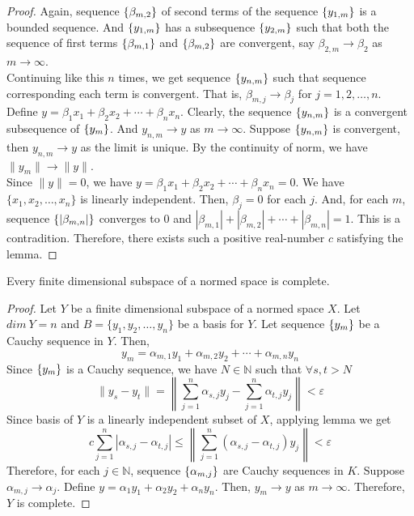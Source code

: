 \begin{proof}
	Again, sequence $\left\{\beta_{m,2}\right\}$ of second terms of the sequence $\left\{y_{1,m}\right\}$ is a bounded sequence.
	And $\left\{y_{1,m}\right\}$ has a subsequence $\left\{y_{2,m}\right\}$ such that both the sequence of first terms $\left\{\beta_{m,1}\right\}$ and $\left\{\beta_{m,2}\right\}$ are convergent, say $\beta_{2,m} \to \beta_2$ as $m \to \infty$.\\

	Continuing like this $n$ times, we get sequence $\left\{y_{n,m}\right\}$ such that sequence corresponding each term is convergent.
	That is, $\beta_{m,j} \to \beta_j$ for $j=1,2,\dots,n$.\\

	Define $y = \beta_1 x_1 + \beta_2 x_2 + \dotsb + \beta_n x_n$.
	Clearly, the sequence $\left\{y_{n,m}\right\}$ is a convergent subsequence of $\left\{y_m\right\}$.
	And $y_{n,m} \to y$ as $m \to \infty$.
	Suppose $\left\{y_{n,m}\right\}$ is convergent, then $y_{n,m} \to y$ as the limit is unique.
	By the continuity of norm, we have $\| y_m \| \to \| y \|$.\\

	Since $\| y \| = 0$, we have $y = \beta_1 x_1 + \beta_2 x_2 + \dotsb + \beta_n x_n = 0$.
	We have $\{ x_1, x_2, \dots, x_n \}$ is linearly independent.
	Then, $\beta_j = 0$ for each $j$.
	And, for each $m$, sequence $\left\{|\beta_{m,n} |\right\}$ converges to $0$ and $|\beta_{m,1}|+|\beta_{m,2}|+\dotsb+|\beta_{m,n}| = 1$.
	This is a contradition.
	Therefore, there exists such a positive real-number $c$ satisfying the lemma.
\end{proof}
\begin{theorem}
	Every finite dimensional subspace of a normed space is complete.
\end{theorem}
\begin{proof}
	Let $Y$ be a finite dimensional subspace of a normed space $X$.
	Let $dim\ Y = n$ and $B = \{ y_1, y_2, \dots, y_n \}$ be a basis for $Y$.
	Let sequence $\left\{y_m\right\}$ be a Cauchy sequence in $Y$.
	Then,
	\[ y_m = \alpha_{m,1} y_1 + \alpha_{m,2} y_2 + \dotsb + \alpha_{m,n} y_n \]
	Since $\left\{y_m\right\}$ is a Cauchy sequence, we have $N \in \mathbb{N}$ such that $\forall s,t > N$
	\[ \| y_s - y_t \| = \left\| \sum_{j=1}^n \alpha_{s,j} y_j - \sum_{j=1}^n \alpha_{t,j} y_j \right\| < \varepsilon \]
	Since basis of $Y$ is a linearly independent subset of $X$, applying lemma we get
	\[ c \sum_{j=1}^n \left|\alpha_{s,j} - \alpha_{t,j} \right| \le \left \| \sum_{j=1}^n (\alpha_{s,j}-\alpha_{t,j}) y_j \right\| < \varepsilon \]
	Therefore, for each $j \in \mathbb{N}$, sequence $\left\{\alpha_{m,j}\right\}$ are Cauchy sequences in $K$.
	Suppose $\alpha_{m,j} \to \alpha_j$.
	Define $y = \alpha_1 y_1 + \alpha_2 y_2 + \alpha_n y_n$.
	Then, $y_m \to y$ as $m \to \infty$.
	Therefore, $Y$ is complete.
\end{proof}

